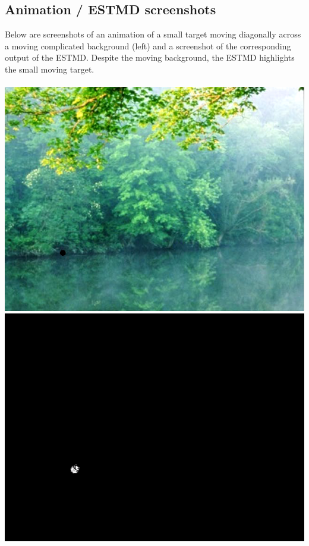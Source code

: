 \documentclass[a4paper,11pt]{article}
\begin{document}
\newpage
\begin{appendices}
\section{Animation / ESTMD screenshots}
Below are screenshots of an animation of a small target moving diagonally across a moving complicated background (left) and a screenshot of the corresponding output of the ESTMD. Despite the moving background, the ESTMD highlights the small moving target. \\ \\
\includegraphics[scale = 0.4]{input}
\includegraphics[scale = 0.5]{processed}


\end{appendices}
\end{document}
